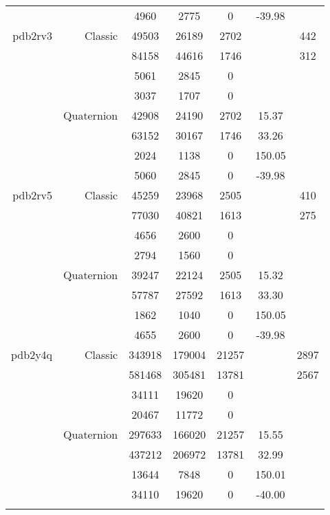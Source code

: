 \begin{xltabular}{\textwidth}{r|rcccSc}
& & 4960 & 2775 & 0 & -39.98 & \\ \addlinespace
pdb2rv3 & Classic & 49503 & 26189 & 2702 & & 442 \\
& & 84158 & 44616 & 1746 & & 312 \\
& & 5061 & 2845 & 0 & & \\
& & 3037 & 1707 & 0 & & \\
& Quaternion & 42908 & 24190 & 2702 & 15.37 & \\
& & 63152 & 30167 & 1746 & 33.26 & \\
& & 2024 & 1138 & 0 & 150.05 & \\
& & 5060 & 2845 & 0 & -39.98 & \\ \addlinespace
pdb2rv5 & Classic & 45259 & 23968 & 2505 & & 410 \\
& & 77030 & 40821 & 1613 & & 275 \\
& & 4656 & 2600 & 0 & & \\
& & 2794 & 1560 & 0 & & \\
& Quaternion & 39247 & 22124 & 2505 & 15.32 & \\
& & 57787 & 27592 & 1613 & 33.30 & \\
& & 1862 & 1040 & 0 & 150.05 & \\
& & 4655 & 2600 & 0 & -39.98 & \\ \addlinespace
pdb2y4q & Classic & 343918 & 179004 & 21257 & & 2897 \\
& & 581468 & 305481 & 13781 & & 2567 \\
& & 34111 & 19620 & 0 & & \\
& & 20467 & 11772 & 0 & & \\
& Quaternion & 297633 & 166020 & 21257 & 15.55 & \\
& & 437212 & 206972 & 13781 & 32.99 & \\
& & 13644 & 7848 & 0 & 150.01 & \\
& & 34110 & 19620 & 0 & -40.00 & \\ \addlinespace
\end{xltabular}
